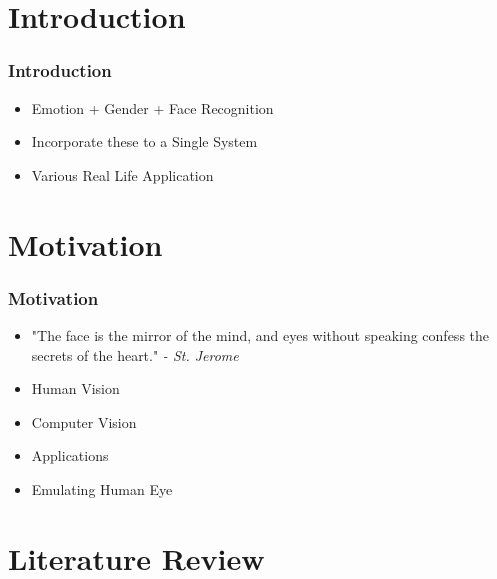 \documentclass{beamer}
\begin{document}
	
	\section{Introduction}
		
	\begin{frame}
		
		\frametitle{Introduction}
		
		\begin{itemize}
			\item Emotion + Gender + Face Recognition \newline
			\item Incorporate these to a Single System \newline
			\item Various Real Life Application\newline
			
		\end{itemize}
		
	\end{frame}

	\section{Motivation}
		
	\begin{frame}
		
		\frametitle{Motivation}
		
		\justifying
		\indent
		\begin{itemize}
			\item "The face is the mirror of the mind, and eyes without speaking confess the secrets of the heart." \textit{- St. Jerome}\newline
			\item Human Vision\newline
			\item Computer Vision\newline
			\item Applications\newline
			\item Emulating Human Eye\newline
			
		\end{itemize}
		
	\end{frame}
	
	\section{Literature Review}
	
\end{document}
